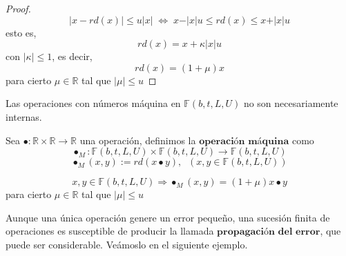 \begin{proof}
\[ \vert x - rd(x) \vert \leq u \vert x \vert \; \Leftrightarrow \; x - \vert x \vert u \leq rd(x) \leq x + \vert x \vert u \]
esto es,
\[ rd(x) = x +\kappa \vert x \vert u \]
con $\vert \kappa \vert \leq 1$, es decir,
\[ rd(x) = (1 + \mu )x \]
para cierto $\mu \in \mathbb{R}$ tal que $\vert \mu \vert \leq u$
\end{proof}

Las operaciones con números máquina en $\mathbb{F} (b,t,L,U)$ no son necesariamente internas.

\begin{ndef}
Sea $ \bullet : \mathbb{R} \times \mathbb{R} \rightarrow \mathbb{R}$ una operación, definimos la $\textbf{operación máquina}$ como
\[ \bullet _M : \mathbb{F} (b,t,L,U) \times \mathbb{F} (b,t,L,U) \rightarrow \mathbb{F} (b,t,L,U) \]
\[ \bullet _M (x,y) := rd(x \bullet y), \; \; (x,y \in \mathbb{F} (b,t,L,U)) \]
\end{ndef}

\begin{ncor}
\[ x,y \in \mathbb{F} (b,t,L,U) \Rightarrow \bullet _M (x,y) = (1 + \mu ) x \bullet y \]
para cierto $\mu \in \mathbb{R}$ tal que $\vert \mu \vert \leq u$
\end{ncor}

Aunque una única operación genere un error pequeño, una sucesión finita de operaciones es susceptible de producir la llamada $\textbf{propagación del error}$, que puede ser considerable. Veámoslo en el siguiente ejemplo.

